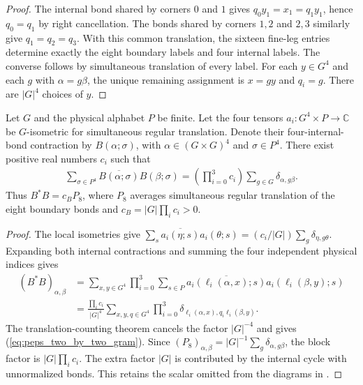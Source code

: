 \begin{proof}\leanok
    The internal bond shared by corners $0$ and $1$ gives
    $q_0y_1=x_1=q_1y_1$, hence $q_0=q_1$ by right cancellation.
    The bonds shared by corners $1,2$ and $2,3$ similarly give
    $q_1=q_2=q_3$. With this common translation, the sixteen fine-leg
    entries determine exactly the eight boundary labels and four internal
    labels. The converse follows by simultaneous translation of every label.
    For each $y\in G^4$ and each $g$ with $\alpha=g\beta$, the unique
    remaining assignment is $x=gy$ and $q_i=g$. There are $|G|^4$ choices
    of $y$.
\end{proof}

\begin{lemma}%
    \label{thm:peps_two_by_two_gram}
    \leanok
    Let $G$ and the physical alphabet $P$ be finite. Let the four tensors
    $a_i:G^4\times P\to\mathbb C$ be $G$-isometric for simultaneous
    regular translation. Denote their four-internal-bond contraction
    by $B(\alpha;\sigma)$, with $\alpha\in(G\times G)^4$ and
    $\sigma\in P^4$. There exist positive real numbers $c_i$ such that
    \begin{align}
        \sum_{\sigma\in P^4}
        \overline{B(\alpha;\sigma)}B(\beta;\sigma)
        =\left(\prod_{i=0}^3c_i\right)
        \sum_{g\in G}\delta_{\alpha,g\beta}.
        \label{eq:peps_two_by_two_gram}
    \end{align}
    Thus $B^*B=c_B P_8$, where $P_8$ averages simultaneous regular
    translation of the eight boundary bonds and
    $c_B=|G|\prod_i c_i>0$.
\end{lemma}

\begin{proof}\leanok
    The local isometries give
    $\sum_s\overline{a_i(\eta;s)}a_i(\theta;s)
        =(c_i/|G|)\sum_g\delta_{\eta,g\theta}$.
    Expanding both internal contractions and summing the four independent
    physical indices gives
    \begin{align}
        (B^*B)_{\alpha,\beta}
         & =\sum_{x,y\in G^4}\prod_{i=0}^3
        \sum_{s\in P}
        \overline{a_i(\ell_i(\alpha,x);s)}
        a_i(\ell_i(\beta,y);s)             \\
         & =\frac{\prod_i c_i}{|G|^4}
        \sum_{x,y,q\in G^4}
        \prod_{i=0}^3
        \delta_{\ell_i(\alpha,x),q_i\ell_i(\beta,y)}.
    \end{align}
    The translation-counting theorem cancels the factor $|G|^{-4}$ and
    gives (\ref{eq:peps_two_by_two_gram}). Since
    $(P_8)_{\alpha,\beta}=|G|^{-1}\sum_g\delta_{\alpha,g\beta}$,
    the block factor is $|G|\prod_i c_i$. The extra factor $|G|$ is
    contributed by the internal cycle with unnormalized bonds. This retains
    the scalar omitted from the diagrams in
    \cite[Lemma~6.2 and Observations~6.5--6.6]{Schuch2010PEPS}.
\end{proof}


